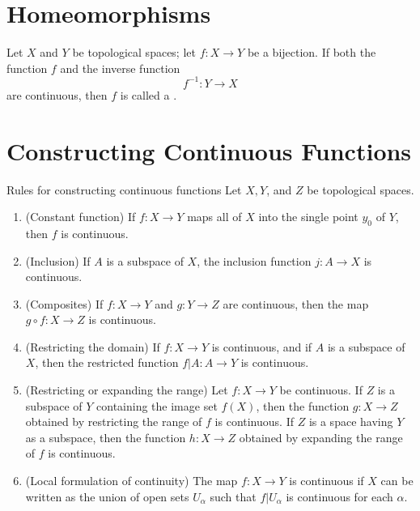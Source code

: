 \documentclass[../main.tex]{subfiles}
\begin{document}
\section{Homeomorphisms}

\begin{definition}{}{}
    Let $X$ and $Y$ be topological spaces; let $f: X \to Y$ be a bijection. If both the function $f$ and the inverse function
\[ f^{-1} : Y \to X \]
are continuous, then $f$ is called a .
\end{definition}

\section{Constructing Continuous Functions}

\begin{theorem}{Rules for constructing continuous functions}{}
Let $X, Y$, and $Z$ be topological spaces.
\begin{enumerate}
\item[(a)] (Constant function) If $f: X \to Y$ maps all of $X$ into the single point $y_0$ of $Y$, then $f$ is continuous.
\item[(b)] (Inclusion) If $A$ is a subspace of $X$, the inclusion function $j: A \to X$ is continuous.
\item[(c)] (Composites) If $f: X \to Y$ and $g: Y \to Z$ are continuous, then the map $g \circ f: X \to Z$ is continuous.
\item[(d)] (Restricting the domain) If $f: X \to Y$ is continuous, and if $A$ is a subspace of $X$, then the restricted function $f|A: A \to Y$ is continuous.
\item[(e)] (Restricting or expanding the range) Let $f: X \to Y$ be continuous. If $Z$ is a subspace of $Y$ containing the image set $f(X)$, then the function $g: X \to Z$ obtained by restricting the range of $f$ is continuous. If $Z$ is a space having $Y$ as a subspace, then the function $h: X \to Z$ obtained by expanding the range of $f$ is continuous.
\item[(f)] (Local formulation of continuity) The map $f: X \to Y$ is continuous if $X$ can be written as the union of open sets $U_\alpha$ such that $f|U_\alpha$ is continuous for each $\alpha$.
\end{enumerate}
\end{theorem}
\end{document}

